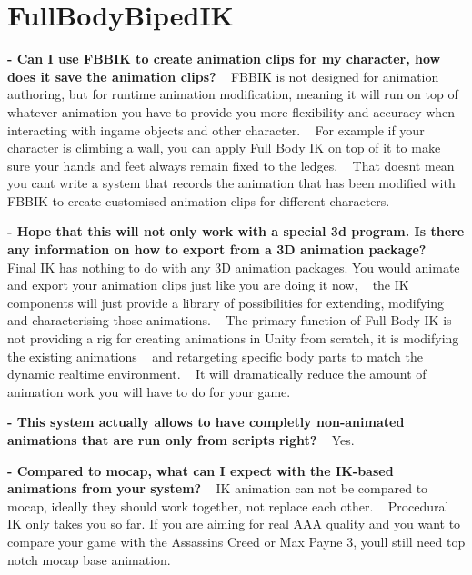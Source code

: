 \hypertarget{page14_FullBodyBipedIK}{}\section{Full\+Body\+Biped\+IK}\label{page14_FullBodyBipedIK}
{\bfseries -\/ Can I use F\+B\+B\+IK to create animation clips for my character, how does it save the animation clips?} ~\newline
F\+B\+B\+IK is not designed for animation authoring, but for runtime animation modification, meaning it will run on top of whatever animation you have to provide you more flexibility and accuracy when interacting with ingame objects and other character. ~\newline
For example if your character is climbing a wall, you can apply Full Body IK on top of it to make sure your hands and feet always remain fixed to the ledges. ~\newline
That doesn\textquotesingle{}t mean you can\textquotesingle{}t write a system that records the animation that has been modified with F\+B\+B\+IK to create customised animation clips for different characters.

{\bfseries -\/ Hope that this will not only work with a special 3d program. Is there any information on how to export from a 3D animation package?} ~\newline
Final IK has nothing to do with any 3D animation packages. You would animate and export your animation clips just like you are doing it now, ~\newline
the IK components will just provide a library of possibilities for extending, modifying and characterising those animations. ~\newline
The primary function of Full Body IK is not providing a rig for creating animations in Unity from scratch, it is modifying the existing animations ~\newline
and retargeting specific body parts to match the dynamic realtime environment. ~\newline
It will dramatically reduce the amount of animation work you will have to do for your game.

{\bfseries -\/ This system actually allows to have completly non-\/animated animations that are run only from scripts right? } ~\newline
 Yes.

{\bfseries -\/ Compared to mocap, what can I expect with the I\+K-\/based animations from your system?} ~\newline
IK animation can not be compared to mocap, ideally they should work together, not replace each other. ~\newline
Procedural IK only takes you so far. If you are aiming for real A\+AA quality and you want to compare your game with the Assassins Creed or Max Payne 3, you\textquotesingle{}ll still need top notch mocap base animation.

